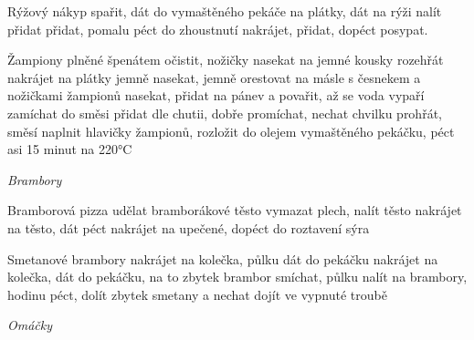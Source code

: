 \documentclass[12pt,a4paper]{article}
\begin{document}
\begin{recipe}{Rýžový nákyp}
   spařit, dát do vymaštěného pekáče
   na plátky, dát na rýži
   nalít
   přidat
   přidat, pomalu péct do zhoustnutí
   nakrájet, přidat, dopéct
   posypat.
\end{recipe}
\newpage

\begin{recipe}{Žampiony plněné špenátem}
   očistit, nožičky nasekat na jemné kousky
   rozehřát
   nakrájet na plátky
   jemně nasekat, jemně orestovat na másle s česnekem a nožičkami žampionů
   nasekat, přidat na pánev a povařit, až se voda vypaří
   zamíchat do směsi
   přidat dle chutii, dobře promíchat, nechat chvilku prohřát, směsí naplnit hlavičky žampionů, rozložit do olejem vymaštěného pekáčku, péct asi 15 minut na 220°C
\end{recipe}
\newpage

\vspace*{\fill}
\hfill {\Huge\it Brambory}\hfill
\vspace*{\fill}
\newpage

\begin{recipe}{Bramborová pizza}
   udělat bramborákové těsto
   vymazat plech, nalít těsto
   nakrájet na těsto, dát péct
   nakrájet na upečené, dopéct do roztavení sýra
\end{recipe}
\newpage

\begin{recipe}{Smetanové brambory}
   nakrájet na kolečka, půlku dát do pekáčku
   nakrájet na kolečka, dát do pekáčku, na to zbytek brambor
   smíchat, půlku nalít na brambory, hodinu péct, dolít zbytek smetany a nechat dojít ve vypnuté troubě
\end{recipe}
\newpage

\vspace*{\fill}
\hfill {\Huge\it Omáčky}\hfill
\vspace*{\fill}
\newpage
\end{document}
